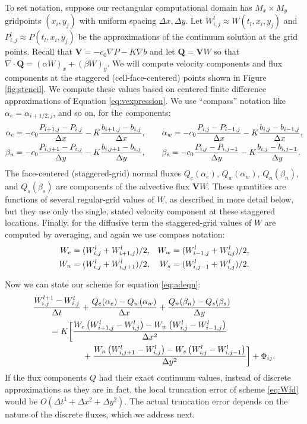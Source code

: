 \documentclass[11pt,final]{amsart}%
\newcommand\bV{\mathbf{V}}
\newcommand\bQ{\mathbf{Q}}
\newcommand{\Div}{\nabla\cdot}
\newcommand{\grad}{\nabla}
\newcommand{\Wlij}{W^l_{i,j}}
\newcommand{\Plij}{P^l_{i,j}}
\begin{document}
To set notation, suppose our rectangular computational domain has $M_x \times M_y$ gridpoints $(x_i,y_j)$ with uniform spacing $\Delta x,\Delta y$.  Let $\Wlij \approx W(t_l,x_i,y_j)$ and $\Plij \approx P(t_l,x_i,y_j)$ be the approximations of the continuum solution at the grid points.  Recall that $\bV = - c_0 \grad P - K \grad b$ and let $\bQ=\bV W$ so that $\Div \bQ = (\alpha W)_x + (\beta W)_y$.  We will compute velocity components and flux components at the staggered (cell-face-centered) points shown in Figure \ref{fig:stencil}.  We compute these values based on centered finite difference approximations of Equation \eqref{eq:vexpression}.  We use ``compass'' notation like $\alpha_e = \alpha_{i+1/2,j}$, and so on, for the components:
\begin{align}
\alpha_e &= - c_0 \frac{P_{i+1,j}-P_{i,j}}{\Delta x} - K \frac{b_{i+1,j}-b_{i,j}}{\Delta x}, \qquad \alpha_w = - c_0 \frac{P_{i,j}-P_{i-1,j}}{\Delta x} - K \frac{b_{i,j}-b_{i-1,j}}{\Delta x}, \label{eq:velocitycomp} \\
\beta_n  &= - c_0 \frac{P_{i,j+1}-P_{i,j}}{\Delta y} - K \frac{b_{i,j+1}-b_{i,j}}{\Delta y}, \qquad \beta_s = - c_0 \frac{P_{i,j}-P_{i,j-1}}{\Delta y} - K \frac{b_{i,j}-b_{i,j-1}}{\Delta y}. \notag
\end{align}
The face-centered (staggered-grid) normal fluxes $Q_e(\alpha_e)$, $Q_w(\alpha_w)$, $Q_n(\beta_n)$, and $Q_s(\beta_s)$ are components of the advective flux $\bV W$.  These quantities are functions of several regular-grid values of $W$, as described in more detail below, but they use only the single, stated velocity component at these staggered locations.  Finally, for the diffusive term the staggered-grid values of $W$ are computed by averaging, and again we use compass notation:
\begin{align}
W_e &= (W_{i,j}^l + W_{i+1,j}^l)/2, & W_w &= (W_{i-1,j}^l + W_{i,j}^l)/2, \label{eq:stagW} \\
W_n &= (W_{i,j}^l + W_{i,j+1}^l)/2, & W_s &= (W_{i,j-1}^l + W_{i,j}^l)/2. \notag
\end{align}

Now we can state our scheme for equation \eqref{eq:adeqn}:
\begin{align}
 &\frac{W_{i,j}^{l+1} - \Wlij}{\Delta t} + \frac{Q_e(\alpha_e) - Q_w(\alpha_w)}{\Delta x} + \frac{Q_n(\beta_n) - Q_s(\beta_s)}{\Delta y}  \label{eq:Wfd} \\
      &\qquad = K \bigg[\frac{W_e \left(W_{i+1,j}^l - \Wlij\right) - W_w \left(\Wlij - W_{i-1,j}^l\right)}{\Delta x^2}  \notag \\
      &\qquad\qquad\qquad + \frac{W_n \left(W_{i,j+1}^l - \Wlij\right) - W_s \left(\Wlij - W_{i,j-1}^l\right)}{\Delta y^2}\bigg] + \Phi_{ij}. \notag
\end{align}
If the flux components $Q$ had their exact continuum values, instead of discrete approximations as they are in fact, the local truncation error \citep{MortonMayers} of scheme \eqref{eq:Wfd} would be $O(\Delta t^1 + \Delta x^2 + \Delta y^2)$.  The actual truncation error depends on the nature of the discrete fluxes, which we address next.
\end{document}
